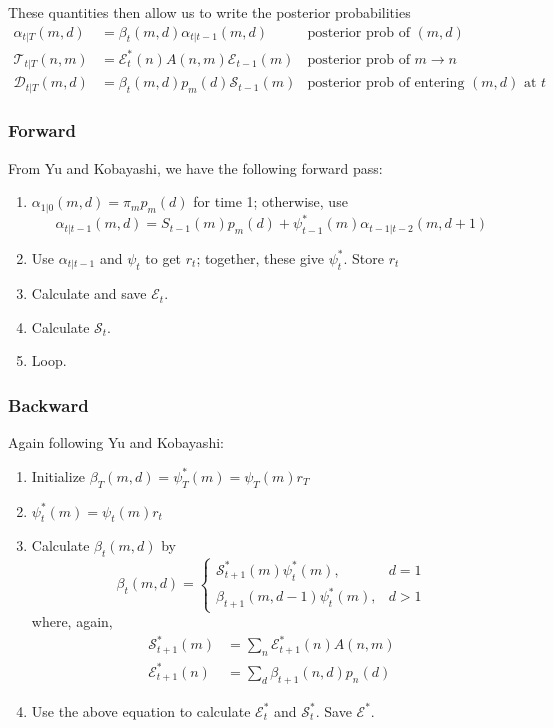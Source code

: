 \documentclass[10pt,letterpaper]{article}
\begin{document}
These quantities then allow us to write the posterior probabilities
\begin{align*}
    \alpha_{t|T}(m, d) &= \beta_t(m, d) \alpha_{t|t-1}(m, d) &\text{posterior prob of }(m, d) \\
    \mathcal{T}_{t|T}(n, m) &= \mathcal{E}^*_t(n) A(n, m) \mathcal{E}_{t - 1}(m) &\text{posterior prob of } m \rightarrow n \\
    \mathcal{D}_{t|T}(m, d) &= \beta_t(m, d)p_m(d) \mathcal{S}_{t-1}(m) &\text{posterior prob of entering }(m, d) \text{ at } t
\end{align*}

\subsubsection{Forward}
From Yu and Kobayashi, we have the following forward pass:
\begin{enumerate}
    \item $\alpha_{1|0}(m, d) = \pi_m p_m(d)$ for time 1; otherwise, use
    \begin{equation}
        \alpha_{t|t-1}(m, d) = S_{t-1}(m) p_m(d) + \psi^*_{t-1}(m) \alpha_{t-1|t-2}(m, d + 1)
    \end{equation}
    \item Use $\alpha_{t|t-1}$ and $\psi_t$ to get $r_t$; together, these give
    $\psi_t^*$. Store $r_t$
    \item Calculate and save $\mathcal{E}_t$.
    \item Calculate $\mathcal{S}_t$.
    \item Loop.
\end{enumerate}

\subsubsection{Backward}
Again following Yu and Kobayashi:
\begin{enumerate}
    \item Initialize $\beta_T(m, d) = \psi^*_T(m) = \psi_T(m) r_T$
    \item $\psi^*_t(m) = \psi_t(m) r_t$
    \item Calculate $\beta_t(m, d)$ by
    \begin{equation}
        \beta_t(m, d) =
        \begin{cases}
            \mathcal{S}^*_{t+1}(m)\psi^*_t(m), & d=1 \\
            \beta_{t+1}(m, d - 1) \psi^*_t(m), & d > 1
        \end{cases}
    \end{equation}
    where, again,
    \begin{align}
        \mathcal{S}^*_{t + 1}(m) &= \sum_{n} \mathcal{E}^*_{t+1}(n) A(n, m) \\
        \mathcal{E}^*_{t + 1}(n) &= \sum_d \beta_{t+1}(n, d) p_n(d)
    \end{align}
    \item Use the above equation to calculate $\mathcal{E}^*_t$ and $\mathcal{S}^*_t$. Save $\mathcal{E}^*$.
\end{enumerate}
\end{document}
